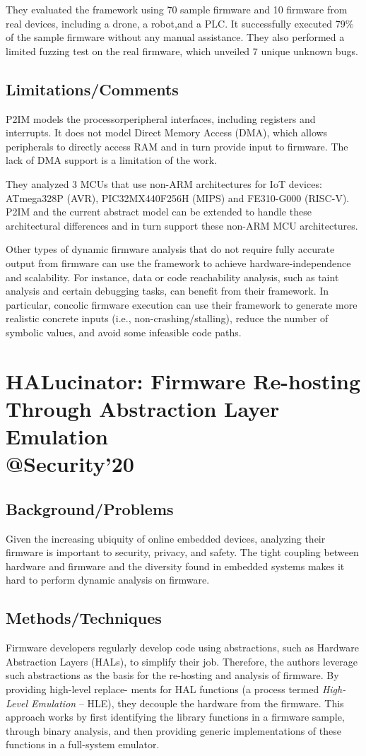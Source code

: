 They evaluated the framework using 70 sample firmware and 10 firmware from real devices, including a drone, a robot,and a PLC. It successfully executed 79\% of the sample firmware without any manual assistance. They also performed a limited fuzzing test on the real firmware, which unveiled 7 unique unknown bugs.
\subsection{Limitations/Comments}
P2IM models the processorperipheral interfaces, including registers and interrupts. It does not model Direct Memory Access (DMA), which allows peripherals to directly access RAM and in turn provide input to firmware. The lack of DMA support is a limitation of the work.

They analyzed 3 MCUs that use non-ARM architectures for IoT devices: ATmega328P (AVR), PIC32MX440F256H (MIPS) and FE310-G000 (RISC-V).  P2IM and the current abstract model can be extended to handle these architectural differences and in turn support these non-ARM MCU architectures.

Other types of dynamic firmware analysis that do not require fully accurate output from firmware can use the framework to achieve hardware-independence and scalability. For instance, data or code reachability analysis, such as taint analysis and certain debugging tasks, can benefit from their framework. In particular, concolic firmware execution can use their framework to generate more realistic concrete inputs (i.e., non-crashing/stalling), reduce the number of symbolic values, and avoid some infeasible code paths.
\newpage
\section{HALucinator: Firmware Re-hosting Through Abstraction Layer Emulation \\@Security'20}
\subsection{Background/Problems}
Given the increasing ubiquity of online embedded devices, analyzing their firmware is important to security, privacy, and safety. The tight coupling between hardware and firmware and the diversity found in embedded systems makes it hard to perform dynamic analysis on firmware.
\subsection{Methods/Techniques}
Firmware developers regularly develop code using abstractions, such as Hardware Abstraction Layers (HALs), to simplify their job.  Therefore, the authors leverage such abstractions as the basis for the re-hosting and analysis of firmware. By providing high-level replace- ments for HAL functions (a process termed \emph{High-Level Emulation} – HLE), they decouple the hardware from the firmware.  This approach works by first identifying the library functions in a firmware sample, through binary analysis, and then providing generic implementations of these functions in a full-system emulator.

